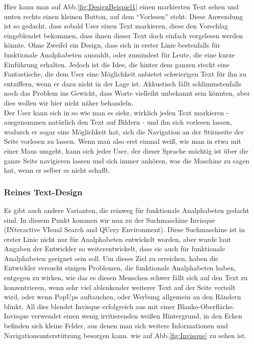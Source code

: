 Hier kann man auf Abb.\ref{fig:DesignBeispiel1} einen markierten Text sehen und unten rechts einen kleinen Button, auf dem "`Vorlesen"' steht. Diese Anwendung ist so gedacht, dass sobald User einen Text markieren, diese den Vorschlag eingeblendet bekommen, dass ihnen dieser Text doch einfach vorgelesen werden könnte. Ohne Zweifel ein Design, dass sich in erster Linie bestenfalls für funktionale Analphabeten auszahlt, oder zumindest für Leute, die eine kurze Einführung erhalten. Jedoch ist die Idee, die hinter dem ganzen steckt eine Fantastische, die dem User eine Möglichkeit anbietet schwierigen Text für ihn zu entziffern, wenn er dazu nicht in der Lage ist. Akkustisch fällt schlimmstenfalls noch das Problem ins Gewicht, dass Worte vielleiht unbekannt sein könnten, aber dies wollen wir hier nicht näher behandeln.\\
Der User kann sich in so wie man es siehr, wirklich jeden Text markieren - ausgenommen natürlich den Text auf Bildern - und ihn sich vorlesen lassen, wodurch er sogar eine Möglichkeit hat, sich die Navigation an der Stirnseite der Seite vorlesen zu lassen. Wenn man also erst einmal weiß, wie man in etwa mit einer Maus umgeht, kann sich jeder User, der dieser Sprache mächtig ist über die ganze Seite navigieren lassen und sich immer anhören, was die Maschine zu sagen hat, wenn er selber es nicht schafft.\\
\newpage
\subsubsection{Reines Text-Design}

Es gibt auch andere Varianten, die reinweg für funktionale Analphabeten gedacht sind. In diesem Punkt kommen wir nun zu der Suchmaschine Invisque (INteractive VIsual Search and QUery Environment). Diese Suchmaschine ist in erster Linie nicht nur für Analphabeten entwickelt worden, aber wurde laut Angaben der Entwickler so weiterentwickelt, dass sie auch für funktionale Analphabeten geeignet sein soll. Um dieses Ziel zu erreichen, haben die Entwickler versucht einigen Problemen, die funktionale Analphabeten haben, entgegen zu wirken, wie das es diesen Menschen schwer fällt sich auf den Text zu konzentrieren, wenn sehr viel ablenkender weiterer Text auf der Seite verteilt wird, oder wenn PopUps auftauchen, oder Werbung allgemein an den Rändern blinkt. All dies blendet Invisque erfolgreich aus mit einer Blanko-Oberfläche. Invisque verwendet einen wenig irritierenden weißen Hintergrund, in den Ecken befinden sich kleine Felder, aus denen man sich weitere Informationen und Navigationsunterstützung besorgen kann. wie auf Abb.\ref{fig:Invisque} zu sehen ist.



